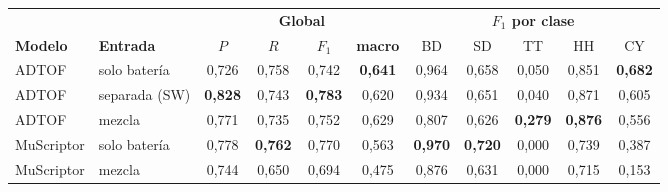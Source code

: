 \begin{tabular}{llcccc|ccccc}
\toprule
& & \multicolumn{4}{c|}{\textbf{Global}} & \multicolumn{5}{c}{\textbf{$F_1$ por clase}} \\
\textbf{Modelo} & \textbf{Entrada} & $P$ & $R$ & $F_1$ & \textbf{macro} & BD & SD & TT & HH & CY \\
\midrule
ADTOF & solo batería & 0{,}726 & 0{,}758 & 0{,}742 & \textbf{0{,}641} & 0{,}964 & 0{,}658 & 0{,}050 & 0{,}851 & \textbf{0{,}682} \\
ADTOF & separada (SW) & \textbf{0{,}828} & 0{,}743 & \textbf{0{,}783} & 0{,}620 & 0{,}934 & 0{,}651 & 0{,}040 & 0{,}871 & 0{,}605 \\
ADTOF & mezcla & 0{,}771 & 0{,}735 & 0{,}752 & 0{,}629 & 0{,}807 & 0{,}626 & \textbf{0{,}279} & \textbf{0{,}876} & 0{,}556 \\
MuScriptor & solo batería & 0{,}778 & \textbf{0{,}762} & 0{,}770 & 0{,}563 & \textbf{0{,}970} & \textbf{0{,}720} & 0{,}000 & 0{,}739 & 0{,}387 \\
MuScriptor & mezcla & 0{,}744 & 0{,}650 & 0{,}694 & 0{,}475 & 0{,}876 & 0{,}631 & 0{,}000 & 0{,}715 & 0{,}153 \\
\bottomrule
\end{tabular}
